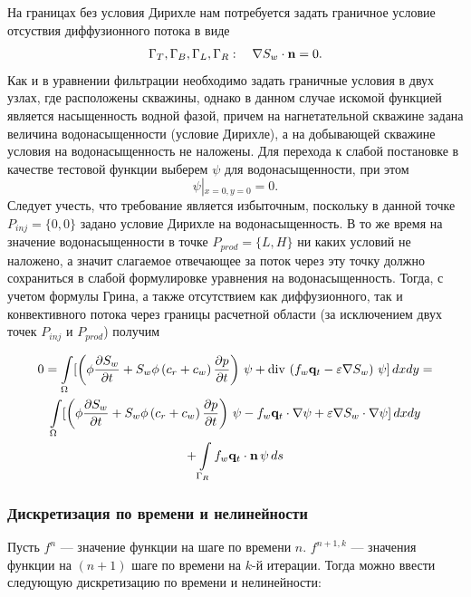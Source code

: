 На границах без условия Дирихле нам потребуется задать граничное условие отсуствия диффузионного потока в виде
\begin{equation}\label{eq:GammaTBLR_Sw_diffusion}
	\Gamma_T, \Gamma_B, \Gamma_L, \Gamma_R: \quad \nabla S_w \cdot \mathbf{n} = 0.
\end{equation}
Как и в уравнении фильтрации необходимо задать граничные условия в двух узлах, где расположены скважины,
однако в данном случае искомой функцией является насыщенность водной фазой, причем на нагнетательной скважине
задана величина водонасыщенности (условие Дирихле), а на добывающей скважине условия на водонасыщенность не наложены.
Для перехода к слабой постановке в качестве тестовой функции выберем $\psi$ для водонасыщенности, при этом 
\begin{equation}\label{eq:psi_equal_zero}
	\psi\left|_{x=0, y=0}\right. = 0.
\end{equation}
Следует учесть, что требование  является избыточным, поскольку в данной 
точке $P_{inj}=\{0,0\}$ задано условие Дирихле на водонасыщенность. В то же время на значение водонасыщенности в точке
$P_{prod}=\{L,H\}$ ни каких условий не наложено, а значит слагаемое отвечающее за поток через эту точку
должно сохраниться в слабой формулировке уравнения на водонасыщенность.
Тогда, с учетом формулы Грина, а также отсутствием как диффузионного, так и конвективного потока через границы
расчетной области (за исключением двух точек $P_{inj}$ и $P_{prod}$) получим

\begin{multline}
	\displaystyle 0=\int\limits_\Omega  [\left(\phi \dfrac{\partial S_w}{\partial t} + S_w\phi\left(c_r + c_w \right)\dfrac{\partial p}{\partial t} \right)\,\psi + \operatorname{div}\, \left( f_w \mathbf{q}_t - \varepsilon \nabla S_w \right)\, \psi] \,dx dy = \\ 
	\int\limits_\Omega[\left(\phi \dfrac{\partial S_w}{\partial t} + S_w\phi\left(c_r + c_w \right)\dfrac{\partial p}{\partial t} \right)\,\psi -  f_w \mathbf{q}_t \cdot \nabla \psi +  \varepsilon \nabla S_w \cdot \nabla \psi] \,dx dy \\
	+\int\limits_{\Gamma_R} f_w \mathbf{q}_t \cdot \mathbf{n} \,\psi \, ds
\end{multline}

\subsubsection{Дискретизация по времени и нелинейности}

Пусть $f^{n}$ --- значение функции на шаге по времени $n$. $f^{n+1,k}$ --- значения функции на $(n+1)$ шаге по времени на $k$-й итерации. Тогда можно ввести следующую дискретизацию по времени и нелинейности:

